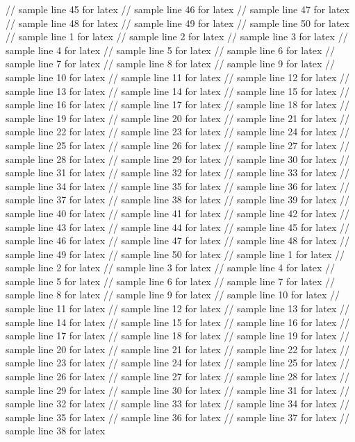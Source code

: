 // sample line 45 for latex
// sample line 46 for latex
// sample line 47 for latex
// sample line 48 for latex
// sample line 49 for latex
// sample line 50 for latex
// sample line 1 for latex
// sample line 2 for latex
// sample line 3 for latex
// sample line 4 for latex
// sample line 5 for latex
// sample line 6 for latex
// sample line 7 for latex
// sample line 8 for latex
// sample line 9 for latex
// sample line 10 for latex
// sample line 11 for latex
// sample line 12 for latex
// sample line 13 for latex
// sample line 14 for latex
// sample line 15 for latex
// sample line 16 for latex
// sample line 17 for latex
// sample line 18 for latex
// sample line 19 for latex
// sample line 20 for latex
// sample line 21 for latex
// sample line 22 for latex
// sample line 23 for latex
// sample line 24 for latex
// sample line 25 for latex
// sample line 26 for latex
// sample line 27 for latex
// sample line 28 for latex
// sample line 29 for latex
// sample line 30 for latex
// sample line 31 for latex
// sample line 32 for latex
// sample line 33 for latex
// sample line 34 for latex
// sample line 35 for latex
// sample line 36 for latex
// sample line 37 for latex
// sample line 38 for latex
// sample line 39 for latex
// sample line 40 for latex
// sample line 41 for latex
// sample line 42 for latex
// sample line 43 for latex
// sample line 44 for latex
// sample line 45 for latex
// sample line 46 for latex
// sample line 47 for latex
// sample line 48 for latex
// sample line 49 for latex
// sample line 50 for latex
// sample line 1 for latex
// sample line 2 for latex
// sample line 3 for latex
// sample line 4 for latex
// sample line 5 for latex
// sample line 6 for latex
// sample line 7 for latex
// sample line 8 for latex
// sample line 9 for latex
// sample line 10 for latex
// sample line 11 for latex
// sample line 12 for latex
// sample line 13 for latex
// sample line 14 for latex
// sample line 15 for latex
// sample line 16 for latex
// sample line 17 for latex
// sample line 18 for latex
// sample line 19 for latex
// sample line 20 for latex
// sample line 21 for latex
// sample line 22 for latex
// sample line 23 for latex
// sample line 24 for latex
// sample line 25 for latex
// sample line 26 for latex
// sample line 27 for latex
// sample line 28 for latex
// sample line 29 for latex
// sample line 30 for latex
// sample line 31 for latex
// sample line 32 for latex
// sample line 33 for latex
// sample line 34 for latex
// sample line 35 for latex
// sample line 36 for latex
// sample line 37 for latex
// sample line 38 for latex
